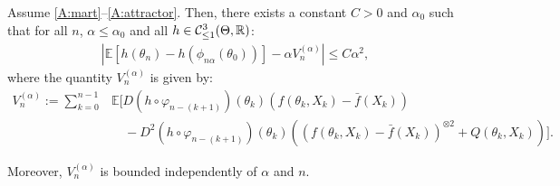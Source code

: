 \documentclass{article}
\newcommand{\R}{\mathbb{R}}
\newcommand\E{\mathbb{E}}
\newcommand\esp[1]{\E\left[#1\right]}
\newcommand\abs[1]{\left|#1\right|}
\newcommand\toA{^{(\alpha)}}
\newcommand\barf{\bar{f}}
\newcommand\cont[3][]{\mathcal{C}^{#2}_{\ifthenelse{\equal{#1}{all}}{}{\le1}}(#3,\R)}
\begin{document}
\begin{proposition}
    \label{prop:Vn}
    Assume \ref{A:mart}--\ref{A:attractor}. Then, there exists a constant $C>0$ and $\alpha_0$ such that for all $n$, $\alpha\le\alpha_0$ and all $h\in\cont{3}{\Theta}$:
    \begin{align*}
        \abs{\esp{h(\theta_n) - h(\phi_{n\alpha}(\theta_0))} - \alpha V\toA_{n}} \le C\alpha^2,
    \end{align*}
    where the quantity $V\toA_{n}$ is given by:
    \begin{align*}
        V\toA_{n} := \sum_{k=0}^{n-1} &\E\Big[D(h\circ\varphi_{n-(k+1)})(\theta_{k})(f(\theta_{k},X_{k})-\barf(X_{k}))\\
        &\quad - D^2(h\circ\varphi_{n-(k+1)})(\theta_{k}) \left((f (\theta_{k},X_{k})-\barf(X_{k}))^{\otimes 2} + Q(\theta_{k},X_{k})\right)\Big].
    \end{align*}

    Moreover, $V\toA_n$ is bounded independently of $\alpha$ and $n$.  
\end{proposition}
\end{document}
